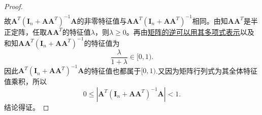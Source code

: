 \documentclass[../../main.tex]{subfiles}%
\begin{document}
\begin{proof}
\begin{align*}
\end{align*}
故$\boldsymbol{A}^{T} \left( \boldsymbol{I}_n + \boldsymbol{A}\boldsymbol{A}^{T} \right)^{-1}\boldsymbol{A}$的非零特征值与$\boldsymbol{A}\boldsymbol{A}^{T} \left( \boldsymbol{I}_n + \boldsymbol{A}\boldsymbol{A}^{T} \right)^{-1}$相同。由知$\boldsymbol{A}\boldsymbol{A}^{T}$是半正定阵，任取$\boldsymbol{A}\boldsymbol{A}^{T}$的特征值$\lambda$，则$\lambda \geqslant 0$。再由\hyperref[proposition:矩阵的逆可以用其多项式表示]{矩阵的逆可以用其多项式表示}以及和知$\boldsymbol{A}\boldsymbol{A}^{T} \left( \boldsymbol{I}_n + \boldsymbol{A}\boldsymbol{A}^{T} \right)^{-1}$的特征值为
$$\frac{\lambda}{1 + \lambda} \in [0, 1).$$
因此$\boldsymbol{A}^{T}(\boldsymbol{I}_n + \boldsymbol{A}\boldsymbol{A}^{T})^{-1}\boldsymbol{A}$的特征值也都属于$[0,1)$.又因为矩阵行列式为其全体特征值乘积，所以
$$0 \leqslant \left| \boldsymbol{A}^{T}(\boldsymbol{I}_n + \boldsymbol{A}\boldsymbol{A}^{T})^{-1}\boldsymbol{A} \right| < 1.$$
结论得证。

\end{proof}
\end{document}
